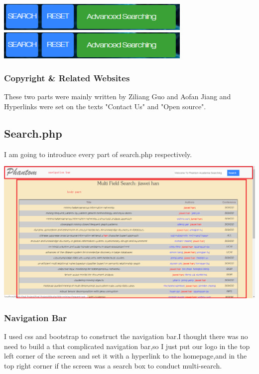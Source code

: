 \documentclass[10pt,twoside,a4paper,titlepage]{article}
\begin{document}
	\newline	
	\includegraphics[width=0.7\textwidth]{cyf/Advanced_searching30.png}
	\newline	
	\includegraphics[width=0.7\textwidth]{cyf/Advanced_searching31.png}
	
	\subsubsection{Copyright \& Related Websites}
	
	These two parts were mainly written by Ziliang Guo and Aofan Jiang and Hyperlinks were set on the texts "Contact Us" and "Open source".
	
	\subsection{Search.php}
	
	I am going to introduce every part of search.php respectively.
	\newline
	
	\includegraphics[width=1.0\textwidth]{cyf/SEARCH_struct1.png}
	
	\subsubsection{Navigation Bar}
	
	I used css and bootstrap to construct the navigation bar.I thought there was no need to build a  that complicated navigation bar,so I just put our logo in the top left corner of the screen and set it with a hyperlink to the homepage,and in the top right corner if the screen was a search box to conduct multi-search.
	
\end{document}
